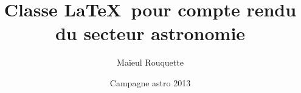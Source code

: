 \documentclass{plasci-secastro}
\date{Campagne astro 2013}
\author{Maïeul Rouquette}
\title{Classe \LaTeX\ pour compte rendu du secteur astronomie}
\begin{document}
\maketitle
\lipsum
\lipsum
\end{document}

